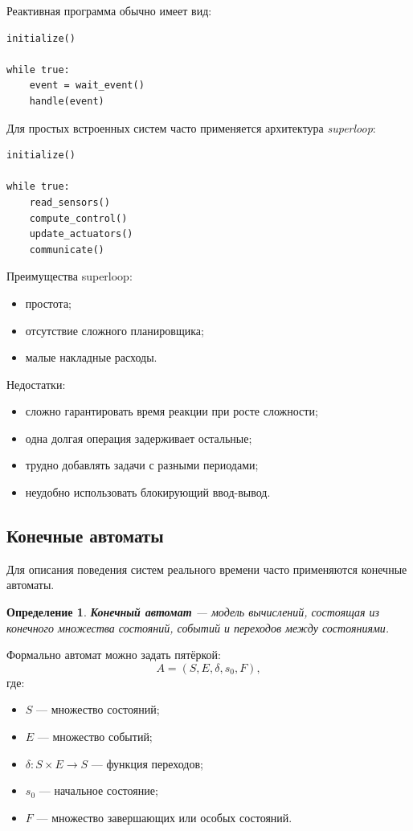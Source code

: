 \documentclass[12pt,a4paper]{article}
\newtheorem{definition}{Определение}
\begin{document}
Реактивная программа обычно имеет вид:
\begin{verbatim}
initialize()

while true:
    event = wait_event()
    handle(event)
\end{verbatim}

Для простых встроенных систем часто применяется архитектура \emph{superloop}:

\begin{verbatim}
initialize()

while true:
    read_sensors()
    compute_control()
    update_actuators()
    communicate()
\end{verbatim}

Преимущества superloop:
\begin{itemize}
    \item простота;
    \item отсутствие сложного планировщика;
    \item малые накладные расходы.
\end{itemize}

Недостатки:
\begin{itemize}
    \item сложно гарантировать время реакции при росте сложности;
    \item одна долгая операция задерживает остальные;
    \item трудно добавлять задачи с разными периодами;
    \item неудобно использовать блокирующий ввод-вывод.
\end{itemize}

\subsection{Конечные автоматы}

Для описания поведения систем реального времени часто применяются конечные автоматы.

\begin{definition}
\textbf{Конечный автомат} --- модель вычислений, состоящая из конечного множества состояний, событий и переходов между состояниями.
\end{definition}

Формально автомат можно задать пятёркой:
\[
    A = (S, E, \delta, s_0, F),
\]
где:
\begin{itemize}
    \item $S$ --- множество состояний;
    \item $E$ --- множество событий;
    \item $\delta: S \times E \to S$ --- функция переходов;
    \item $s_0$ --- начальное состояние;
    \item $F$ --- множество завершающих или особых состояний.
\end{itemize}
\end{document}
